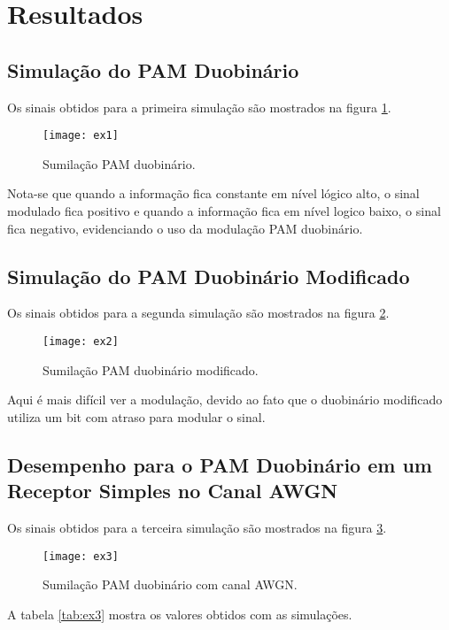 \newpage
\section{Resultados}

\subsection{Simulação do PAM Duobinário}
Os sinais obtidos para a primeira simulação são mostrados na figura 
\ref{fig:ex1}.

\begin{figure}[H]
  \centering
  \caption{Sumilação PAM duobinário.}
  \texttt{[image: ex1]}
  \label{fig:ex1}
\end{figure}

Nota-se que quando a informação fica constante em nível lógico alto, o sinal 
modulado fica positivo e quando a informação fica em nível logico baixo, o 
sinal fica negativo, evidenciando o uso da modulação PAM duobinário.

\subsection{Simulação do PAM Duobinário Modificado}

Os sinais obtidos para a segunda simulação são mostrados na figura  
\ref{fig:ex2}.
\begin{figure}[H]
  \centering
  \caption{Sumilação PAM duobinário modificado.}
  \texttt{[image: ex2]}
  \label{fig:ex2}
\end{figure}

Aqui é mais difícil ver a modulação, devido ao fato que o duobinário modificado 
utiliza um bit com atraso para modular o sinal.

\subsection{Desempenho para o PAM Duobinário em um Receptor Simples no Canal 
AWGN}

Os sinais obtidos para a terceira simulação são mostrados na figura  
\ref{fig:ex3}.
\begin{figure}[H]
  \centering
  \caption{Sumilação PAM duobinário com canal AWGN.}
  \texttt{[image: ex3]}
  \label{fig:ex3}
\end{figure}
        
 A tabela \ref{tab:ex3} mostra os valores obtidos com as simulações.
 
